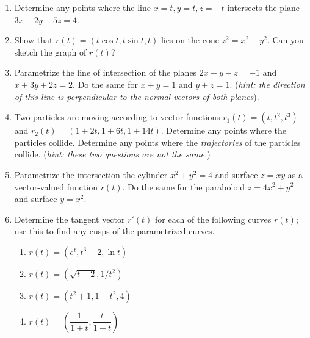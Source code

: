 \documentclass[12pt]{article}
\numberwithin{equation}{subsection}
\numberwithin{figure}{subsection}
\theoremstyle{note}
\begin{document}
{\begin{enumerate}[label=\arabic*.]
\begin{enumerate}
	\item The line starting at $(1,2,3)$ pointed in the direction $(-1,0,1)$.
	\item The line starting at $(-1,2,2)$ pointed towards $(1,1,1)$. 
	\item The line $x=y+2$ viewed in 3 dimensional space as lying in the $xy$-plane
\end{enumerate}



\item Determine any points where the line $x=t,y=t,z=-t$ intersects the plane $3x-2y+5z=4$.

\item Show that $r(t)=(t\cos t, t\sin t, t)$ lies on the cone $z^2=x^2+y^2$. Can you sketch the graph of $r(t)$?

\item Parametrize the line of intersection of the planes $2x-y-z=-1$ and $x+3y+2z=2$. Do the same for $x+y=1$ and $y+z=1$. (\textit{hint: the direction of this line is perpendicular to the normal vectors of both planes}).


\item Two particles are moving according to vector functions $r_1(t)=(t,t^2,t^3)$ and $r_2(t)=(1+2t, 1+6t, 1+14t)$. Determine any points where the particles collide. Determine any points where the \textit{trajectories} of the particles collide. (\textit{hint: these two questions are not the same.}) 

\item Parametrize the intersection the cylinder $x^2+y^2=4$ and surface $z=xy$ as a vector-valued function $r(t)$. Do the same for  the paraboloid $z=4x^2+y^2$ and surface $y=x^2$.


\item Determine the tangent vector $r'(t)$ for each of the following curves $r(t)$; use this to find any cusps of the parametrized curves. 

\begin{enumerate}
	\item $r(t)=(e^t, t^3-2, \ln t)$
	\item $r(t)=(\sqrt{t-2}, 1/t^2)$
	\item $r(t)=(t^2+1, 1-t^2, 4)$
	\item $r(t)=\left(\dfrac{1}{1+t}, \dfrac{t}{1+t}\right)$
\end{enumerate}



\end{enumerate}}
\end{document}
